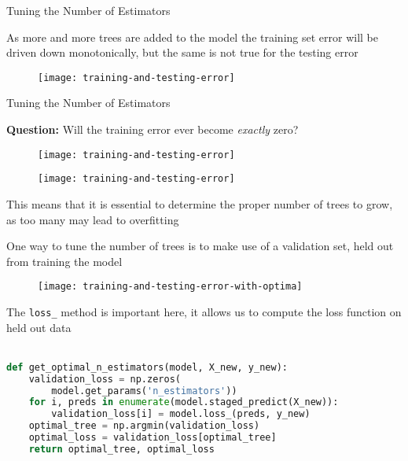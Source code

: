 %
\begin{frame}{Tuning the Number of Estimators}

As more and more trees are added to the model the training set error will be driven down monotonically, but the same is not true for the testing error

  \begin{figure}
    \texttt{[image: training-and-testing-error]}
  \end{figure}

\end{frame}
%
\begin{frame}{Tuning the Number of Estimators}

\textbf{Question:} Will the training error ever become \textit{exactly} zero?

  \begin{figure}
    \texttt{[image: training-and-testing-error]}
  \end{figure}

\end{frame}
%
\begin{frame}

  \begin{figure}
    \texttt{[image: training-and-testing-error]}
  \end{figure}

This means that it is essential to determine the proper number of trees to grow, as too many may lead to overfitting

\end{frame}
%
\begin{frame}
One way to tune the number of trees is to make use of a validation set, held out from training the model

  \begin{figure}
    \texttt{[image: training-and-testing-error-with-optima]}
  \end{figure}
  
\end{frame}
%
\begin{frame}[fragile]
The \texttt{loss\_} method is important here, it allows us to compute the loss function on held out data\\~\\

\begin{lstlisting}[language=python]
def get_optimal_n_estimators(model, X_new, y_new):
    validation_loss = np.zeros(
        model.get_params('n_estimators'))
    for i, preds in enumerate(model.staged_predict(X_new)):
        validation_loss[i] = model.loss_(preds, y_new)    
    optimal_tree = np.argmin(validation_loss)
    optimal_loss = validation_loss[optimal_tree]
    return optimal_tree, optimal_loss
\end{lstlisting}

\end{frame}
